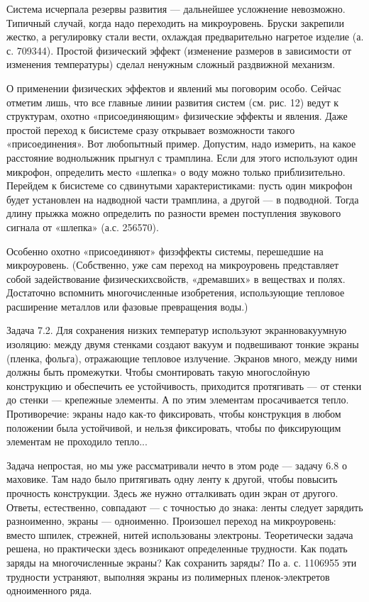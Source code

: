 Система исчерпала резервы развития — дальнейшее усложнение невозможно.
Типичный  случай,  когда  надо   переходить  на  микроуровень.  Бруски
закрепили жестко,  а регулировку стали вести,  охлаждая предварительно
нагретое изделие (а. с.  709344). Простой физический эффект (изменение
размеров  в  зависимости  от изменения  температуры)  сделал  ненужным
сложный раздвижной механизм.

О  применении  физических  эффектов  и  явлений  мы  поговорим  особо.
Сейчас  отметим  лишь, что  все  главные  линии развития  систем  (см.
рис.  12)  ведут  к  структурам,  охотно  «присоединяющим»  физические
эффекты и  явления. Даже простой  переход к бисистеме  сразу открывает
возможности такого  «присоединения». Вот любопытный  пример. Допустим,
надо измерить,  на какое  расстояние воднолыжник прыгнул  с трамплина.
Если для этого  используют один микрофон, определить  место «шлепка» о
воду можно  только приблизительно. Перейдем к  бисистеме со сдвинутыми
характеристиками: пусть  один микрофон  будет установлен  на надводной
части  трамплина, а  другой —  в подводной.  Тогда длину  прыжка можно
определить  по  разности  времен   поступления  звукового  сигнала  от
«шлепка» (а.с. 256570).

Особенно  охотно  «присоединяют»  физэффекты  системы,  перешедшие  на
микроуровень.   (Собственно,   уже   сам   переход   на   микроуровень
представляет  собой  задействование физическихсвойств,  «дремавших»  в
веществах  и полях.  Достаточно вспомнить  многочисленные изобретения,
использующие  тепловое  расширение  металлов или  фазовые  превращения
воды.)

Задача    7.2.   Для    сохранения   низких    температур   используют
экранновакуумную  изоляцию:  между  двумя стенками  создают  вакуум  и
подвешивают  тонкие  экраны   (пленка,  фольга),  отражающие  тепловое
излучение.  Экранов   много,  между   ними  должны   быть  промежутки.
Чтобы  смонтировать такую  многослойную  конструкцию  и обеспечить  ее
устойчивость, приходится протягивать — от стенки до стенки — крепежные
элементы.  А  по  этим элементам  просачивается  тепло.  Противоречие:
экраны надо  как-то фиксировать,  чтобы конструкция в  любом положении
была устойчивой, и нельзя  фиксировать, чтобы по фиксирующим элементам
не проходило тепло...

Задача непростая, но  мы уже рассматривали нечто в этом  роде — задачу
6.8 о маховике.  Там надо было притягивать одну ленту  к другой, чтобы
повысить прочность конструкции. Здесь  же нужно отталкивать один экран
от другого.  Ответы, естественно,  совпадают —  с точностью  до знака:
ленты  следует зарядить  разноименно, экраны  — одноименно.  Произошел
переход на  микроуровень: вместо шпилек, стрежней,  нитей использованы
электроны. Теоретически задача решена,  но практически здесь возникают
определенные трудности.  Как подать  заряды на  многочисленные экраны?
Как  сохранить  заряды? По  а.  с.  1106955 эти  трудности  устраняют,
выполняя экраны из полимерных пленок-электретов одноименного ряда.


